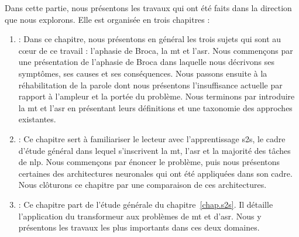 Dans cette partie, nous présentons les travaux qui ont été faits dans la direction que nous explorons.
Elle est organisée en trois chapitres :
\begin{enumerate}[label={Chapitre \arabic*}]
    \item {} :    
    Dans ce chapitre, nous présentons en général les trois sujets qui sont au cœur de ce travail :
    l'aphasie de Broca, la \gls{mt} et l'\gls{asr}.
    Nous commençons par une présentation de l'aphasie de Broca 
    dans laquelle nous décrivons ses symptômes, ses causes et ses conséquences.
    Nous passons ensuite à la réhabilitation de la parole dont nous présentons l'insuffisance actuelle
    par rapport à l'ampleur et la portée du problème.
    Nous terminons par introduire la \gls{mt} et l'\gls{asr} 
    en présentant leurs définitions et une taxonomie des approches existantes.
    
    \item {} :
    Ce chapitre sert à familiariser le lecteur avec l'apprentissage \gls{s2s},
    le cadre d'étude général dans lequel s'inscrivent la \gls{mt}, l'\gls{asr} et la majorité des tâches de \gls{nlp}.
    Nous commençons par énoncer le problème, 
    puis nous présentons certaines des architectures neuronales qui ont été appliquées dans son cadre.
    Nous clôturons ce chapitre par une comparaison de ces architectures.
    
    \item {} :    
    Ce chapitre part de l'étude générale du chapitre~\ref{chap.s2s}.
    Il détaille l'application du transformeur aux problèmes de \gls{mt} et d'\gls{asr}.
    Nous y présentons les travaux les plus importants dans ces deux domaines.
\end{enumerate}

\subsection*{}

